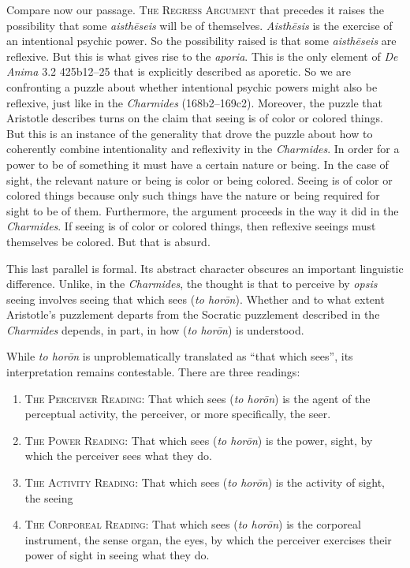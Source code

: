 Compare now our passage. \textsc{The Regress Argument} that precedes it raises the possibility that some \emph{aisthēseis} will be of themselves. \emph{Aisthēsis} is the exercise of an intentional psychic power. So the possibility raised is that some \emph{aisthēseis} are reflexive. But this is what gives rise to the \emph{aporia}. This is the only element of \emph{De Anima} 3.2 425b12–25 that is explicitly described as aporetic. So we are confronting a puzzle about whether intentional psychic powers might also be reflexive, just like in the \emph{Charmides} (168b2–169c2). Moreover, the puzzle that Aristotle describes turns on the claim that seeing is of color or colored things. But this is an instance of the generality that drove the puzzle about how to coherently combine intentionality and reflexivity in the \emph{Charmides}. In order for a power to be of something it must have a certain nature or being. In the case of sight, the relevant nature or being is color or being colored. Seeing is of color or colored things because only such things have the nature or being required for sight to be of them. Furthermore, the argument proceeds in the way it did in the \emph{Charmides}. If seeing is of color or colored things, then reflexive seeings must themselves be colored. But that is absurd.

This last parallel is formal. Its abstract character obscures an important linguistic difference. Unlike, in the \emph{Charmides}, the thought is that to perceive by \emph{opsis} seeing involves seeing that which sees (\emph{to horōn}). Whether and to what extent Aristotle's puzzlement departs from the Socratic puzzlement described in the \emph{Charmides} depends, in part, in how (\emph{to horōn}) is understood.

While \emph{to horōn} is unproblematically translated as ``that which sees'', its interpretation remains contestable. There are three readings:
\begin{enumerate}[(1)]
	\item \textsc{The Perceiver Reading}: That which sees (\emph{to horōn}) is the agent of the perceptual activity, the perceiver, or more specifically, the seer.
	\item \textsc{The Power Reading}: That which sees (\emph{to horōn}) is the power, sight, by which the perceiver sees what they do.
	\item \textsc{The Activity Reading}: That which sees (\emph{to horōn}) is the activity of sight, the seeing
	\item \textsc{The Corporeal Reading}: That which sees (\emph{to horōn}) is the corporeal instrument, the sense organ, the eyes, by which the perceiver exercises their power of sight in seeing what they do.
\end{enumerate}

